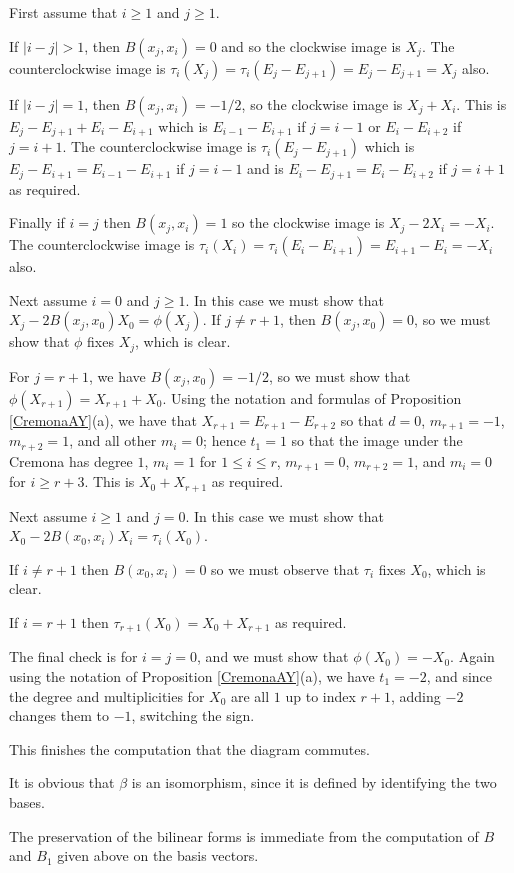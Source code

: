 \documentclass[12pt]{article}
\numberwithin{equation}{section}
\numberwithin{equation}{section}
\numberwithin{subeq}{equation}
\begin{document}
First assume that $i \geq 1$ and $j \geq 1$.

If $|i-j|>1$, then $B(x_j,x_i) = 0$ and so the clockwise image is $X_j$.
The counterclockwise image is $\tau_i(X_j) = \tau_i(E_j-E_{j+1}) = E_j-E_{j+1} = X_j$ also.

If $|i-j|=1$, then $B(x_j,x_i) = -1/2$, so the clockwise image is
$X_j + X_i$.  This is $E_j - E_{j+1} + E_i - E_{i+1}$
which is  $E_{i-1}-E_{i+1}$ if $j=i-1$ or $E_i-E_{i+2}$ if $j = i+1$.
The counterclockwise image is $\tau_i(E_j - E_{j+1})$
which is $E_j-E_{i+1}=E_{i-1}-E_{i+1}$ if $j=i-1$ and is $E_i-E_{j+1} = E_i-E_{i+2}$ if $j=i+1$ as required.

Finally if $i=j$ then $B(x_j,x_i)=1$ so the clockwise image is $X_j-2X_i = -X_i$.
The counterclockwise image is $\tau_i(X_i) = \tau_i(E_i-E_{i+1}) = E_{i+1}-E_i = - X_i$ also.

Next assume $i=0$ and $j \geq 1$.
In this case we must show that $X_j - 2B(x_j,x_0)X_0 = \phi(X_j)$.
If $j \neq r+1$, then $B(x_j,x_0)=0$, so we must show that $\phi$ fixes $X_j$, which is clear.

For $j=r+1$, we have $B(x_j,x_0)=-1/2$, so we must show that
$\phi(X_{r+1}) = X_{r+1} + X_0$.
Using the notation and formulas of Proposition \ref{CremonaAY}(a),
we have that $X_{r+1} = E_{r+1}-E_{r+2}$ so that
$d=0$, $m_{r+1}=-1$, $m_{r+2}=1$, and all other $m_i=0$; hence $t_1 = 1$
so that the image under the Cremona has degree $1$, $m_i = 1$ for $1 \leq i \leq r$, $m_{r+1}=0$,
$m_{r+2}=1$, and $m_i=0$ for $i \geq r+3$.
This is $X_0+X_{r+1}$ as required.

Next assume $i \geq 1$ and $j=0$.
In this case we must show that $X_0 - 2B(x_0,x_i)X_i = \tau_i(X_0)$.

If $i \neq r+1$ then $B(x_0,x_i)=0$ so we must observe that $\tau_i$ fixes $X_0$, which is clear.

If $i = r+1$ then $\tau_{r+1}(X_0) = X_0 + X_{r+1}$ as required.

The final check is for $i=j=0$, and we must show that $\phi(X_0) = - X_0$.
Again using the notation of Proposition \ref{CremonaAY}(a), 
we have $t_1=-2$, and since the degree and multiplicities for $X_0$ are all $1$ up to index $r+1$,
adding $-2$ changes them to $-1$, switching the sign.

This finishes the computation that the diagram commutes.

It is obvious that $\beta$ is an isomorphism, since it is defined by identifying the two bases.

The preservation of the bilinear forms is immediate from the computation of $B$ and $B_1$ given above on the basis vectors.
\end{document}
